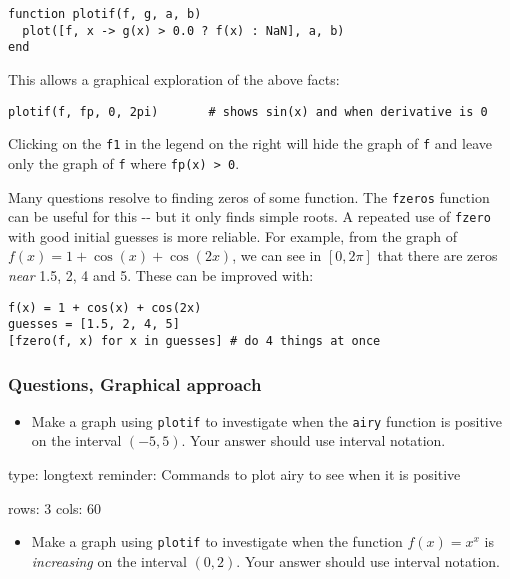 \documentclass[12pt]{article}
\begin{document}
\begin{verbatim}
function plotif(f, g, a, b)
  plot([f, x -> g(x) > 0.0 ? f(x) : NaN], a, b)
end
\end{verbatim}
This allows a graphical exploration of the above facts:



\begin{verbatim}
plotif(f, fp, 0, 2pi)       # shows sin(x) and when derivative is 0
\end{verbatim}
Clicking on the \texttt{f1} in the legend on the right will hide the
graph of \texttt{f} and leave only the graph of \texttt{f} where
\texttt{fp(x) \textgreater{} 0}.



Many questions resolve to finding zeros of some function. The
\texttt{fzeros} function can be useful for this -{}- but it only finds
simple roots. A repeated use of \texttt{fzero} with good initial guesses
is more reliable. For example, from the graph of
$f(x) = 1 + \cos(x) + \cos(2x)$, we can see in $[0,2\pi]$ that there are
zeros \emph{near} 1.5, 2, 4 and 5. These can be improved with:



\begin{verbatim}
f(x) = 1 + cos(x) + cos(2x)
guesses = [1.5, 2, 4, 5]
[fzero(f, x) for x in guesses] # do 4 things at once
\end{verbatim}
\subsubsection{Questions, Graphical approach}

\begin{itemize}
\itemsep1pt\parskip0pt
\item
  Make a graph using \texttt{plotif} to investigate when the
  \texttt{airy} function is positive on the interval $(-5,5)$. Your
  answer should use interval notation.
\end{itemize}

\begin{answer}
type: longtext
reminder: Commands to plot airy to see when it is positive

rows: 3
cols: 60
\end{answer}

\begin{itemize}
\itemsep1pt\parskip0pt
\item
  Make a graph using \texttt{plotif} to investigate when the function
  $f(x) =   x^x$ is \emph{increasing} on the interval $(0,2)$. Your
  answer should use interval notation.
\end{itemize}
\end{document}
